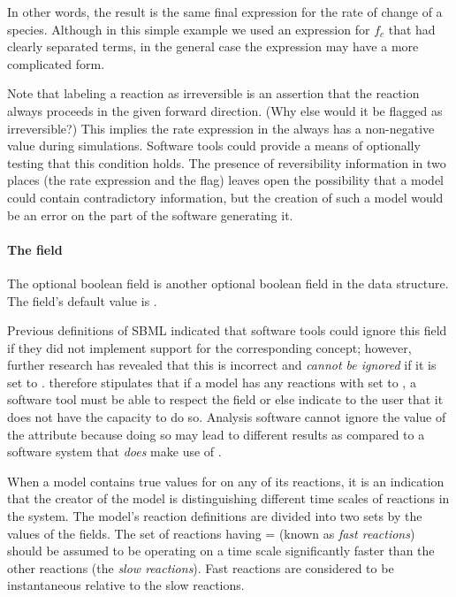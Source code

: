 In other words, the result is the same final expression for the
rate of change of a species.  Although in this simple example we
used an expression for $f_c$ that had clearly separated terms, in
the general case the expression may have a more complicated form.

Note that labeling a reaction as irreversible is an assertion that
the reaction always proceeds in the given forward direction.  (Why
else would it be flagged as irreversible?)  This implies the rate
expression in the \KineticLaw always has a non-negative value
during simulations.  Software tools could provide a means of
optionally testing that this condition holds.  The presence of
reversibility information in two places (\ie the rate expression
and the  flag) leaves open the possibility that
a model could contain contradictory information, but the creation
of such a model would be an error on the part of the software
generating it.


\paragraph{The  field}
\label{sec:fast}

The optional boolean field  is another optional
boolean field in the \Reaction data structure.  The field's
default value is .

Previous definitions of SBML indicated that software tools could
ignore this field if they did not implement support for the
corresponding concept; however, further research has revealed that
this is incorrect and  \emph{cannot be ignored} if it
is set to .  \sbmltwotwo therefore stipulates that if a
model has any reactions with  set to , a
software tool must be able to respect the field or else indicate
to the user that it does not have the capacity to do so.  Analysis
software cannot ignore the value of the  attribute
because doing so may lead to different results as compared to a
software system that \emph{does} make use of .

When a model contains true values for  on any of its
reactions, it is an indication that the creator of the model is
distinguishing different time scales of reactions in the system.
The model's reaction definitions are divided into two sets by the
values of the  fields.  The set of reactions having
= (known as \emph{fast reactions}) should be
assumed to be operating on a time scale significantly faster than
the other reactions (the \emph{slow reactions}).  Fast reactions
are considered to be instantaneous relative to the slow reactions.

